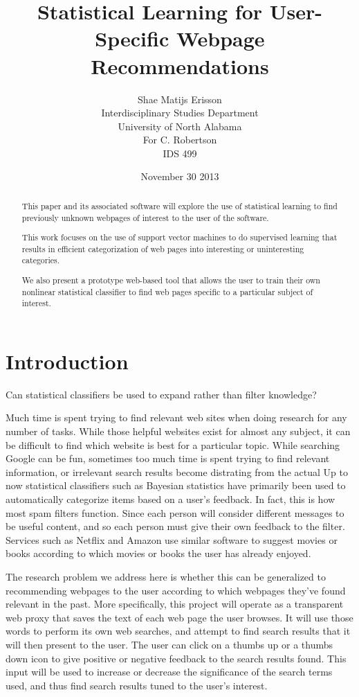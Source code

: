 \documentclass[12pt]{article}
\author{Shae Matijs Erisson\\Interdisciplinary Studies Department\\University of North Alabama\\For
  C. Robertson\\IDS 499}
\title{Statistical Learning for User-Specific Webpage Recommendations}
\date{November 30 2013}
\begin{document}
\maketitle{}
\pagebreak{}
\tableofcontents{}
\pagebreak{}
\begin{abstract}
  This paper and its associated software will explore the use of statistical learning to find previously
  unknown webpages of interest to the user of the software.

  This work focuses on the use of support vector machines to do supervised learning that results in efficient
  categorization of web pages into interesting or uninteresting categories.

  We also present a prototype web-based tool that allows the user to train their own nonlinear statistical
  classifier to find web pages specific to a particular subject of interest.
\end{abstract}

\pagebreak{}
\section{Introduction}
Can statistical classifiers be used to expand rather than filter knowledge?

Much time is spent trying to find relevant web sites when doing research for any number of tasks. While those
helpful websites exist for almost any subject, it can be difficult to find which website is best for a
particular topic. While searching Google can be fun, sometimes too much time is spent trying to find relevant
information, or irrelevant search results become distrating from the actual
Up to now statistical classifiers such as Bayesian statistics have primarily been used to automatically
categorize items based on a user's feedback. In fact, this is how most spam filters function. Since each
person will consider different messages to be useful content, and so each person must give their own feedback
to the filter. Services such as Netflix and Amazon use similar software to suggest movies or books according
to which movies or books the user has already enjoyed.

The research problem we address here is whether this can be generalized to recommending webpages to the user
according to which webpages they've found relevant in the past. More specifically, this project will operate
as a transparent web proxy that saves the text of each web page the user browses. It will use those words to
perform its own web searches, and attempt to find search results that it will then present to the user. The
user can click on a thumbs up or a thumbs down icon to give positive or negative feedback to the search
results found. This input will be used to increase or decrease the significance of the search terms used, and
thus find search results tuned to the user's interest.
\end{document}
